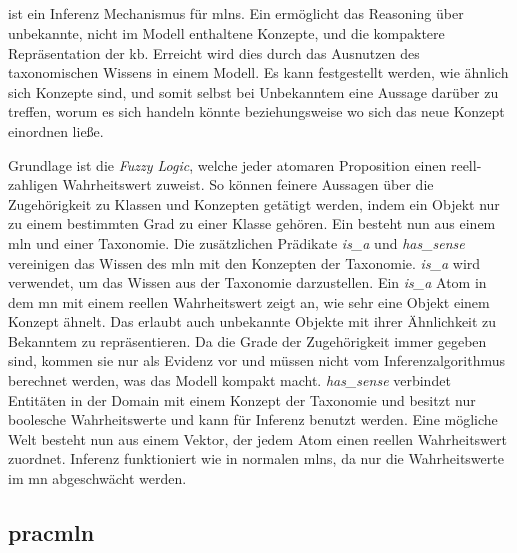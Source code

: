 \subsection{\fuzzymln}
\label{subsec:fuzzymln}
\fuzzymln ist ein Inferenz Mechanismus für \glspl{mln}. Ein \fuzzymln ermöglicht das Reasoning über unbekannte, nicht im Modell enthaltene Konzepte, und die kompaktere Repräsentation der \gls{kb}. Erreicht wird dies durch das Ausnutzen des taxonomischen Wissens in einem Modell. Es kann festgestellt werden, wie ähnlich sich Konzepte sind, und somit selbst bei Unbekanntem eine Aussage darüber zu treffen, worum es sich handeln könnte beziehungsweise wo sich das neue Konzept einordnen ließe. \par
Grundlage ist die \textit{Fuzzy Logic}, welche jeder atomaren Proposition einen reell-zahligen Wahrheitswert zuweist. So können feinere Aussagen über die Zugehörigkeit zu Klassen und Konzepten getätigt werden, indem ein Objekt nur zu einem bestimmten Grad zu einer Klasse gehören. Ein \fuzzymln besteht nun aus einem \gls{mln} und einer Taxonomie. Die zusätzlichen Prädikate \textit{is\_a} und \textit{has\_sense} vereinigen das Wissen des \gls{mln} mit den Konzepten der Taxonomie. \textit{is\_a} wird verwendet, um das Wissen aus der Taxonomie darzustellen. Ein \textit{is\_a} Atom in dem \gls{mn} mit einem reellen Wahrheitswert zeigt an, wie sehr eine Objekt einem Konzept ähnelt. Das erlaubt auch unbekannte Objekte mit ihrer Ähnlichkeit zu Bekanntem zu repräsentieren. Da die Grade der Zugehörigkeit immer gegeben sind, kommen sie nur als Evidenz vor und müssen nicht vom Inferenzalgorithmus berechnet werden, was das Modell kompakt macht. \textit{has\_sense} verbindet Entitäten in der Domain mit einem Konzept der Taxonomie und besitzt nur boolesche Wahrheitswerte und kann für Inferenz benutzt werden. \newline
Eine mögliche Welt besteht nun aus einem Vektor, der jedem Atom einen reellen Wahrheitswert zuordnet. Inferenz funktioniert wie in normalen \glspl{mln}, da nur die Wahrheitswerte im \gls{mn} abgeschwächt werden. \cite{nyga17}


\subsection{pracmln}
\label{subsec:pracmln}
